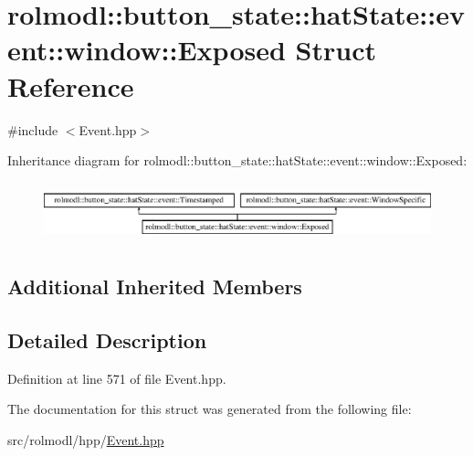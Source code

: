 \hypertarget{structrolmodl_1_1button__state_1_1hat_state_1_1event_1_1window_1_1_exposed}{}\section{rolmodl\+::button\+\_\+state\+::hat\+State\+::event\+::window\+::Exposed Struct Reference}
\label{structrolmodl_1_1button__state_1_1hat_state_1_1event_1_1window_1_1_exposed}


{\ttfamily \#include $<$Event.\+hpp$>$}

Inheritance diagram for rolmodl\+::button\+\_\+state\+::hat\+State\+::event\+::window\+::Exposed\+:\begin{figure}[H]
\begin{center}
\leavevmode
\includegraphics[height=1.728395cm]{structrolmodl_1_1button__state_1_1hat_state_1_1event_1_1window_1_1_exposed}
\end{center}
\end{figure}
\subsection*{Additional Inherited Members}


\subsection{Detailed Description}


Definition at line 571 of file Event.\+hpp.



The documentation for this struct was generated from the following file\+:\begin{DoxyCompactItemize}
\item 
src/rolmodl/hpp/\mbox{\hyperlink{_event_8hpp}{Event.\+hpp}}\end{DoxyCompactItemize}
